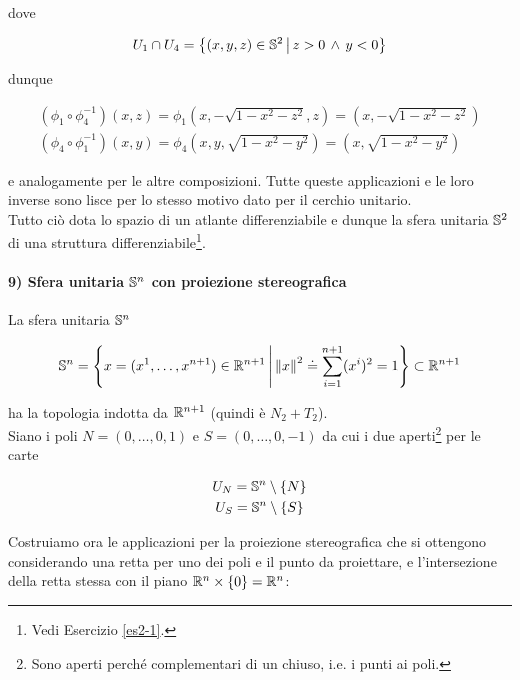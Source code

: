 dove

\begin{equation}
	U_{1} \cap U_{4} = \left\{ (x,y,z) \in \S^{2} \st z>0 \, \wedge \, y<0 \right\}
\end{equation}

dunque

\begin{gather}
	(\phi_{1} \circ \phi_{4}^{-1})(x,z) = \phi_{1} \left( x,-\sqrt{1-x^{2}-z^{2}},z \right) = \left( x,-\sqrt{1-x^{2}-z^{2}} \right)\\
	(\phi_{4} \circ \phi_{1}^{-1})(x,y) = \phi_{4} \left( x,y,\sqrt{1-x^{2}-y^{2}} \right) = \left( x,\sqrt{1-x^{2}-y^{2}} \right)
\end{gather}

e analogamente per le altre composizioni. Tutte queste applicazioni e le loro inverse sono lisce per lo stesso motivo dato per il cerchio unitario.\\
Tutto ciò dota lo spazio di un atlante differenziabile e dunque la sfera unitaria $ \S^{2} $ di una struttura differenziabile\footnote{%
	Vedi Esercizio \ref{es2-1}.%
}.

\paragraph{9) Sfera unitaria $ \S^{n} $ con proiezione stereografica}

La sfera unitaria $ \S^{n} $

\begin{equation}
	\S^{n} = \left\{ x = (x^{1},\dots,x^{n+1}) \in \R^{n+1} \st \norm{x}^{2} \doteq \sum_{i=1}^{n+1} (x^{i})^{2} = 1 \right\} \subset \R^{n+1}
\end{equation}

ha la topologia indotta da $ \R^{n+1} $ (quindi è $ N_{2}+T_{2} $).\\
Siano i poli $ N = (0,\dots,0,1) $ e $ S = (0,\dots,0,-1) $ da cui i due aperti\footnote{%
	Sono aperti perché complementari di un chiuso, i.e. i punti ai poli.%
} per le carte

\begin{gather}
	U_{N} = \S^{n} \setminus \{N\}\\
	U_{S} = \S^{n} \setminus \{S\}
\end{gather}

Costruiamo ora le applicazioni per la proiezione stereografica che si ottengono considerando una retta per uno dei poli e il punto da proiettare, e l'intersezione della retta stessa con il piano $ \R^{n} \times \{0\} = \R^{n} $:

